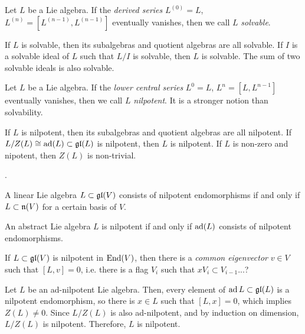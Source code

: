 \documentclass{../../large}
\begin{document}
\begin{prb}
Let $L$ be a Lie algebra.
If the \emph{derived series} $L^{(0)}=L$, $L^{(n)}=[L^{(n-1)},L^{(n-1)}]$ eventually vanishes, then we call $L$ \emph{solvable}.

If $L$ is solvable, then its subalgebras and quotient algebras are all solvable.
If $I$ is a solvable ideal of $L$ such that $L/I$ is solvable, then $L$ is solvable.
The sum of two solvable ideals is also solvable.


Let $L$ be a Lie algebra.
If the \emph{lower central series} $L^0=L$, $L^n=[L,L^{n-1}]$ eventually vanishes, then we call $L$ \emph{nilpotent}.
It is a stronger notion than solvability.

If $L$ is nilpotent, then its subalgebras and quotient algebras are all nilpotent.
If $L/Z(L)\cong\operatorname{ad}(L)\subset\mathfrak{gl}(L)$ is nilpotent, then $L$ is nilpotent.
If $L$ is non-zero and nipotent, then $Z(L)$ is non-trivial.
\end{prb}

\begin{prb}
.
\begin{parts}
\item A linear Lie algebra $L\subset\mathfrak{gl}(V)$ consists of nilpotent endomorphisms if and only if $L\subset\mathfrak{n}(V)$ for a certain basis of $V$.
\item An abstract Lie algebra $L$ is nilpotent if and only if $\operatorname{ad}(L)$ consists of nilpotent endomorphisms.
\item If $L\subset\mathfrak{gl}(V)$ is nilpotent in $\operatorname{End}(V)$, then there is a \emph{common eigenvector} $v\in V$ such that $[L,v]=0$, i.e. there is a flag $V_i$ such that $xV_i\subset V_{i-1}$...?
\end{parts}
\end{prb}
\begin{pf}



Let $L$ be an ad-nilpotent Lie algebra.
Then, every element of $\operatorname{ad} L\subset\mathfrak{gl}(L)$ is a nilpotent endomorphism, so there is $x\in L$ such that $[L,x]=0$, which implies $Z(L)\ne0$.
Since $L/Z(L)$ is also ad-nilpotent, and by induction on dimension, $L/Z(L)$ is nilpotent.
Therefore, $L$ is nilpotent.
\end{pf}
\end{document}
